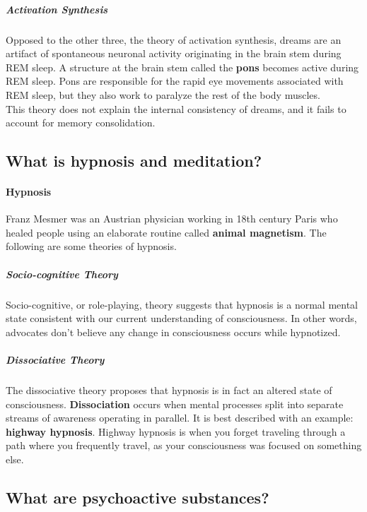 \documentclass[10pt,letter]{article}
\theoremstyle{plain}
\theoremstyle{definition}
\begin{document}
\subparagraph{Activation Synthesis}
Opposed to the other three, the theory of activation synthesis, dreams are an artifact of spontaneous neuronal activity originating in the brain stem during REM sleep. A structure at the brain stem called the \textbf{pons} becomes active during REM sleep. Pons are responsible for the rapid eye movements associated with REM sleep, but they also work to paralyze the rest of the body muscles. \\ 
This theory does not explain the internal consistency of dreams, and it fails to account for memory consolidation. 


\subsection*{What is hypnosis and meditation?}
\paragraph{Hypnosis}
Franz Mesmer was an Austrian physician working in 18th century Paris who healed people using an elaborate routine called \textbf{animal magnetism}. The following are some theories of hypnosis. 
\subparagraph{Socio-cognitive Theory}
Socio-cognitive, or role-playing, theory suggests that hypnosis is a normal mental state consistent with our current understanding of consciousness. In other words, advocates don't believe any change in consciousness occurs while hypnotized. 
\subparagraph{Dissociative Theory}
The dissociative theory proposes that hypnosis is in fact an altered state of consciousness. \textbf{Dissociation} occurs when mental processes split into separate streams of awareness operating in parallel. It is best described with an example: \textbf{highway hypnosis}. Highway hypnosis is when you forget traveling through a path where you frequently travel, as your consciousness was focused on something else.

\subsection*{What are psychoactive substances?}
\end{document}
